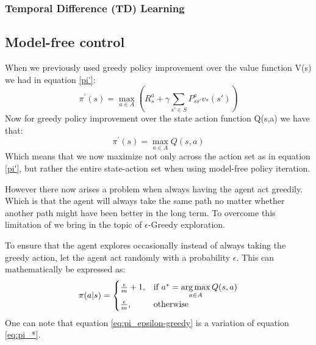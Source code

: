 \subsubsection{Temporal Difference (TD) Learning}


\subsection{Model-free control}

When we previously used greedy policy improvement over the value function V(s) we had in equation \ref{pi'}:
\[\pi^{'}(s) = \max\limits_{a \in A}(R^{a}_s+\gamma\sum_{s'\in S}P^{a}_{ss'}v_*(s'))\]
Now for greedy policy improvement over the state action function Q(s,a) we have that:
\begin{equation}
	\pi^{'}(s) = \max\limits_{a \in A}Q(s,a)
\end{equation}
Which means that we now maximize not only across the action set as in equation \ref{pi'}, but rather the entire state-action set when using model-free policy iteration.

However there now arises a problem when always having the agent act greedily. Which is that the agent will always take the same path no matter whether another path might have been better in the long term. To overcome this limitation of we bring in the topic of $\epsilon$-Greedy exploration.

To ensure that the agent explores occasionally instead of always taking the greedy action, let the agent act randomly with a probability $\epsilon$. This can mathematically be expressed as:
\begin{align}
	\pi(a|s)=\begin{cases}
		\frac{\epsilon}{m}+1, & \text{if $a^* = \operatorname*{arg\,max}\limits_{a \in A}Q (s,a)$}\\
		\frac{\epsilon}{m}, & \text{otherwise}
	\end{cases}
	\label{eq:pi_epsilon-greedy}
\end{align}
One can note that equation \ref{eq:pi_epsilon-greedy} is a variation of equation \ref{eq:pi_*}.


